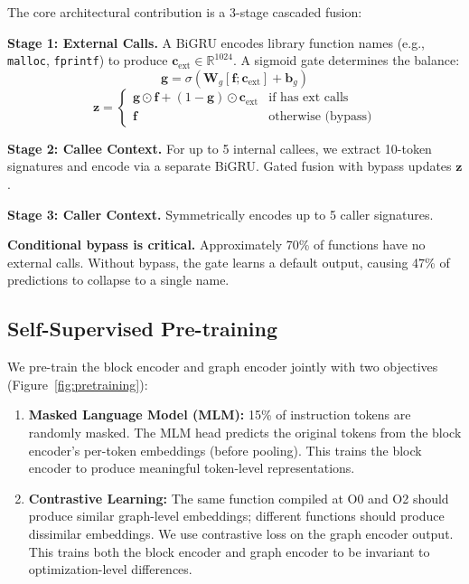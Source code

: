 \documentclass[sigconf,nonacm]{acmart}
\begin{document}
The core architectural contribution is a 3-stage cascaded fusion:

\textbf{Stage 1: External Calls.} A BiGRU encodes library function names (e.g., \texttt{malloc}, \texttt{fprintf}) to produce $\mathbf{c}_\text{ext} \in \mathbb{R}^{1024}$. A sigmoid gate determines the balance:
\begin{equation}
    \mathbf{g} = \sigma(\mathbf{W}_g [\mathbf{f}; \mathbf{c}_\text{ext}] + \mathbf{b}_g)
\end{equation}
\begin{equation}
    \mathbf{z} = \begin{cases}
        \mathbf{g} \odot \mathbf{f} + (1 - \mathbf{g}) \odot \mathbf{c}_\text{ext} & \text{if has ext calls} \\
        \mathbf{f} & \text{otherwise (bypass)}
    \end{cases}
\end{equation}

\textbf{Stage 2: Callee Context.} For up to 5 internal callees, we extract 10-token signatures and encode via a separate BiGRU. Gated fusion with bypass updates $\mathbf{z}$.

\textbf{Stage 3: Caller Context.} Symmetrically encodes up to 5 caller signatures.

\textbf{Conditional bypass is critical.} Approximately 70\% of functions have no external calls. Without bypass, the gate learns a default output, causing 47\% of predictions to collapse to a single name.

\subsection{Self-Supervised Pre-training}

We pre-train the block encoder and graph encoder jointly with two objectives (Figure~\ref{fig:pretraining}):

\begin{enumerate}
    \item \textbf{Masked Language Model (MLM):} 15\% of instruction tokens are randomly masked. The MLM head predicts the original tokens from the block encoder's per-token embeddings (before pooling). This trains the block encoder to produce meaningful token-level representations.
    \item \textbf{Contrastive Learning:} The same function compiled at O0 and O2 should produce similar graph-level embeddings; different functions should produce dissimilar embeddings. We use contrastive loss on the graph encoder output. This trains both the block encoder and graph encoder to be invariant to optimization-level differences.
\end{enumerate}
\end{document}
